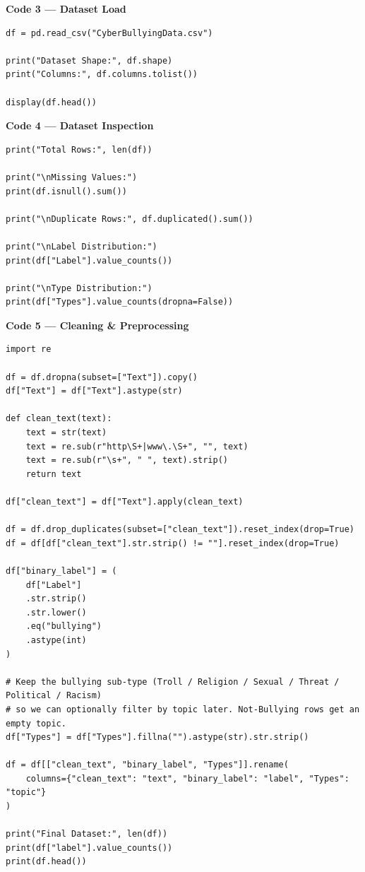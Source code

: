 \documentclass[11pt,a4paper]{article}
\begin{document}
\noindent\textbf{Code 3 --- Dataset Load}
\begin{lstlisting}
df = pd.read_csv("CyberBullyingData.csv")

print("Dataset Shape:", df.shape)
print("Columns:", df.columns.tolist())

display(df.head())
\end{lstlisting}

\noindent\textbf{Code 4 --- Dataset Inspection}
\begin{lstlisting}
print("Total Rows:", len(df))

print("\nMissing Values:")
print(df.isnull().sum())

print("\nDuplicate Rows:", df.duplicated().sum())

print("\nLabel Distribution:")
print(df["Label"].value_counts())

print("\nType Distribution:")
print(df["Types"].value_counts(dropna=False))
\end{lstlisting}

\noindent\textbf{Code 5 --- Cleaning \& Preprocessing}
\begin{lstlisting}
import re

df = df.dropna(subset=["Text"]).copy()
df["Text"] = df["Text"].astype(str)

def clean_text(text):
    text = str(text)
    text = re.sub(r"http\S+|www\.\S+", "", text)
    text = re.sub(r"\s+", " ", text).strip()
    return text

df["clean_text"] = df["Text"].apply(clean_text)

df = df.drop_duplicates(subset=["clean_text"]).reset_index(drop=True)
df = df[df["clean_text"].str.strip() != ""].reset_index(drop=True)

df["binary_label"] = (
    df["Label"]
    .str.strip()
    .str.lower()
    .eq("bullying")
    .astype(int)
)

# Keep the bullying sub-type (Troll / Religion / Sexual / Threat / Political / Racism)
# so we can optionally filter by topic later. Not-Bullying rows get an empty topic.
df["Types"] = df["Types"].fillna("").astype(str).str.strip()

df = df[["clean_text", "binary_label", "Types"]].rename(
    columns={"clean_text": "text", "binary_label": "label", "Types": "topic"}
)

print("Final Dataset:", len(df))
print(df["label"].value_counts())
print(df.head())
\end{lstlisting}
\end{document}
